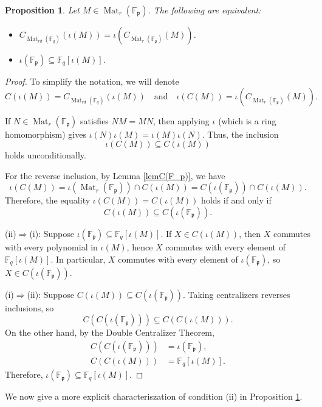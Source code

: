 \documentclass[12pt]{amsart}
\newtheorem{prop}[thm]{Proposition}
\theoremstyle{definition}
\theoremstyle{remark}
\numberwithin{equation}{section}
\numberwithin{thm}{section}
\DeclareMathOperator{\Mat}{Mat}
\newcommand{\fp}{\mathfrak{p}}
\newcommand{\F}{\mathbb{F}}
\begin{document}
 \begin{prop}\label{propCM}
 	Let $M\in \Mat_r(\F_\fp)$. The following are equivalent: 
 	\begin{itemize}
 		\item[(i)] $C_{\Mat_{rd}(\F_q)}(\iota(M))=\iota\left(C_{\Mat_r(\F_\fp)}(M)\right)$.
 		\item[(ii)]  $\iota(\F_\fp)\subseteq \F_q[\iota(M)]$. 
 	\end{itemize}
 \end{prop}
 \begin{proof} To simplify the notation, we will denote 
 	\[C(\iota(M))= C_{\Mat_{rd}(\F_q)}(\iota(M))\quad \text{and}\quad \iota(C(M))=\iota\left(C_{\Mat_r(\F_\fp)}(M)\right).
 	\] 
 	
 	If $N\in \Mat_r(\F_\fp)$ satisfies $NM=MN$, then applying $\iota$ (which is a ring homomorphism) gives $\iota(N)\iota(M)=\iota(M)\iota(N)$. 
 	Thus, the inclusion  
 	\[
 	\iota\left(C(M)\right) \subseteq C(\iota(M)) 
 	\]
 	holds unconditionally. 
 	
 	For the reverse inclusion, by Lemma \ref{lemC(F_p)}, we have 
 	\[
 	\iota\left(C(M)\right)  = 	\iota(\Mat_r(\F_\fp))  \cap C(\iota(M)) = C(\iota(\F_\fp)) \cap C(\iota(M)). 
 	\]
 	Therefore, the equality $\iota\left(C(M)\right)  = C(\iota(M))$ holds if and only if 
 	\[
 	C(\iota(M))\subseteq C(\iota(\F_\fp)). 
 	\]
 	
 	(ii)$\Rightarrow$(i): Suppose $\iota(\F_\fp)\subseteq \F_q[\iota(M)]$. If $X\in C(\iota(M))$, then $X$ commutes with every 
 	polynomial in $\iota(M)$, hence $X$ commutes with every element of $\F_q[\iota(M)]$. In particular, $X$ commutes 
 	with every element of $\iota(\F_\fp)$, so $X\in C(\iota(\F_\fp))$. 
 	
 	(i)$\Rightarrow$(ii):  Suppose $C(\iota(M))\subseteq C(\iota(\F_\fp))$. Taking centralizers reverses inclusions, so 
 	\[
 	C(C(\iota(\F_\fp)))\subseteq C(C(\iota(M))). 
 	\]
 	On the other hand, by the Double Centralizer Theorem, 
 	\begin{align*}
 	C(C(\iota(\F_\fp))) &= \iota(\F_\fp), \\ 
 	C(C(\iota(M))) &= \F_q[\iota(M)].  
 	\end{align*}
 	Therefore, $\iota(\F_\fp) \subseteq \F_q[\iota(M)]$. 
 \end{proof}
 
 We now give a more explicit characteriszation of condition (ii) in Proposition \ref{propCM}. 
\end{document}
